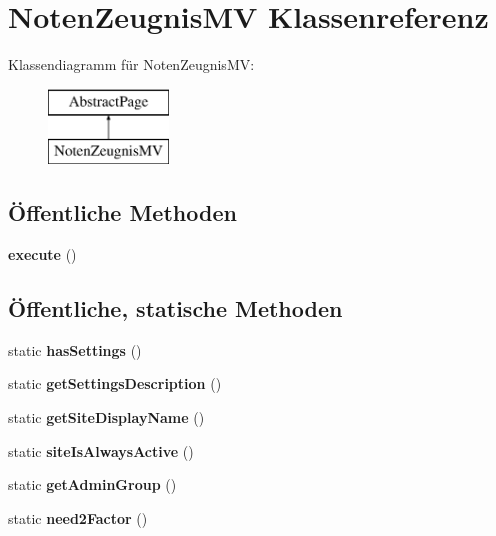 \hypertarget{class_noten_zeugnis_m_v}{}\section{Noten\+Zeugnis\+MV Klassenreferenz}
\label{class_noten_zeugnis_m_v}
Klassendiagramm für Noten\+Zeugnis\+MV\+:\begin{figure}[H]
\begin{center}
\leavevmode
\includegraphics[height=2.000000cm]{class_noten_zeugnis_m_v}
\end{center}
\end{figure}
\subsection*{Öffentliche Methoden}
\begin{DoxyCompactItemize}
\item 
\mbox{\label{class_noten_zeugnis_m_v_a8f52c260716d3eaf2dd8f1bd190a6631}} 
{\bfseries execute} ()
\end{DoxyCompactItemize}
\subsection*{Öffentliche, statische Methoden}
\begin{DoxyCompactItemize}
\item 
\mbox{\label{class_noten_zeugnis_m_v_a83c72d7867d70fef4d653bcd117994c2}} 
static {\bfseries has\+Settings} ()
\item 
\mbox{\label{class_noten_zeugnis_m_v_a51b8cd0c696cc1425ea6eea0574be879}} 
static {\bfseries get\+Settings\+Description} ()
\item 
\mbox{\label{class_noten_zeugnis_m_v_a7deca6e1d50ffda47223f310e135c2e2}} 
static {\bfseries get\+Site\+Display\+Name} ()
\item 
\mbox{\label{class_noten_zeugnis_m_v_a2f47a8d482bb05df6558ec406bdb1376}} 
static {\bfseries site\+Is\+Always\+Active} ()
\item 
\mbox{\label{class_noten_zeugnis_m_v_a5c9977f42dff122eaba9db9186e8ca11}} 
static {\bfseries get\+Admin\+Group} ()
\item 
\mbox{\label{class_noten_zeugnis_m_v_a25136abfa6e9d0871b7298dcc28ae537}} 
static {\bfseries need2\+Factor} ()
\end{DoxyCompactItemize}
